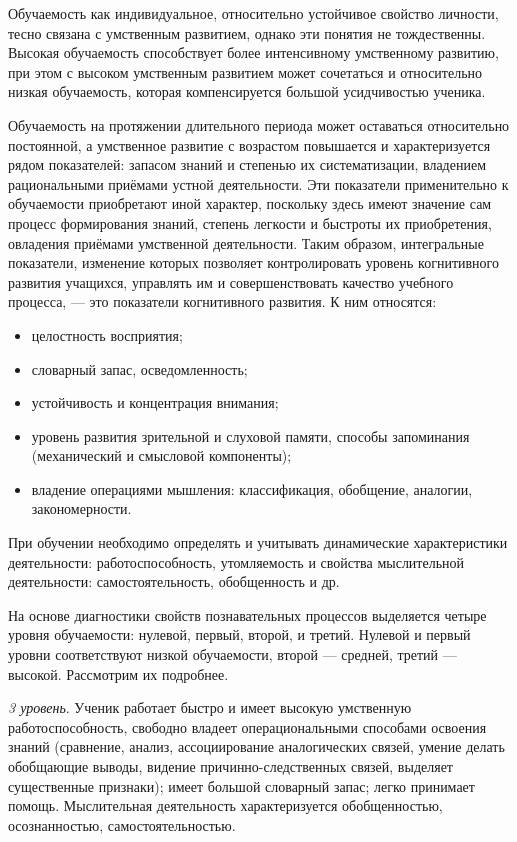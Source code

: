 Обучаемость как индивидуальное, относительно устойчивое свойство личности,
тесно связана с умственным развитием, однако эти понятия не тождественны.
Высокая обучаемость способствует более интенсивному умственному развитию,
при этом с высоком умственным развитием может сочетаться и относительно низкая обучаемость,
которая компенсируется большой усидчивостью ученика.

Обучаемость на протяжении длительного периода может оставаться относительно постоянной,
а умственное развитие с возрастом повышается и характеризуется рядом показателей:
запасом знаний и степенью их систематизации,
владением рациональными приёмами устной деятельности.
Эти показатели применительно к обучаемости приобретают иной характер,
поскольку здесь имеют значение сам процесс формирования знаний,
степень легкости и быстроты их приобретения, овладения приёмами умственной деятельности.
Таким образом, интегральные показатели, изменение которых позволяет контролировать
уровень когнитивного развития учащихся, управлять им и совершенствовать качество учебного процесса, --- это показатели когнитивного развития. К ним относятся:
\begin{itemize}
\item целостность восприятия;
\item словарный запас, осведомленность;
\item устойчивость и концентрация внимания;
\item уровень развития зрительной и слуховой памяти, способы запоминания
  (механический и смысловой компоненты);
\item владение операциями мышления: классификация, обобщение, аналогии, закономерности.
\end{itemize}

При обучении необходимо определять и учитывать динамические характеристики деятельности:
работоспособность, утомляемость и свойства мыслительной деятельности:
самостоятельность, обобщенность и др.

На основе диагностики свойств познавательных процессов выделяется четыре уровня обучаемости:
нулевой, первый, второй, и третий.
Нулевой и первый уровни соответствуют низкой обучаемости,
второй --- средней, третий --- высокой.
Рассмотрим их подробнее.

\textit{3 уровень}. Ученик работает быстро и имеет высокую умственную работоспособность,
свободно владеет операциональными способами освоения знаний
(сравнение, анализ, ассоциирование аналогических связей,
умение делать обобщающие выводы, видение причинно-следственных связей,
выделяет существенные признаки); имеет большой словарный запас; легко принимает помощь.
Мыслительная деятельность характеризуется обобщенностью, осознанностью, самостоятельностью.

